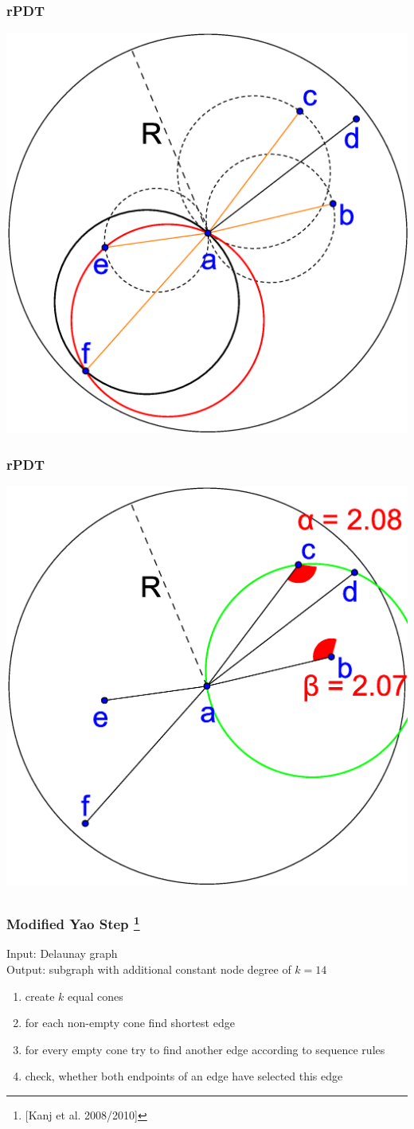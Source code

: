 \documentclass[compress]{beamer}
\begin{document}
\begin{frame} 
\frametitle{rPDT}
\center \includegraphics[width=0.7\linewidth]{PDT_3.eps}
\end{frame}


\begin{frame}
\frametitle{rPDT}
\center \includegraphics[width=0.7\linewidth]{PDT_angle.eps}
\end{frame}

\subsection{}
\begin{frame}
\frametitle{Modified Yao Step \footnote{[Kanj et al. 2008/2010]}}
Input: Delaunay graph \\
Output: subgraph with additional constant node degree of $k = 14 $
	\begin{enumerate}
		\item create $k $ equal cones
		\item for each non-empty cone find shortest edge
		\item for every empty cone try to find another edge according to sequence rules
		\item check, whether both endpoints of an edge have selected this edge
	\end{enumerate}
\end{frame}
\end{document}

